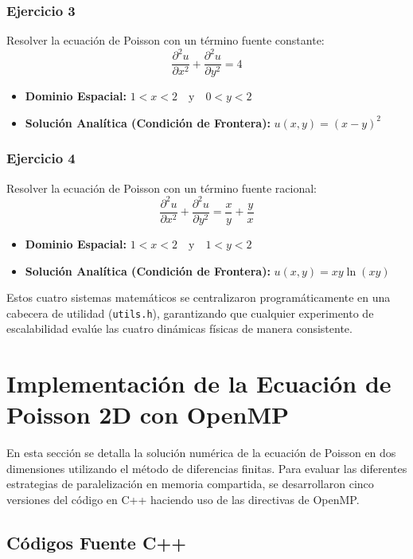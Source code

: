 \subsubsection*{Ejercicio 3}
Resolver la ecuación de Poisson con un término fuente constante:
\begin{equation}
    \frac{\partial^2 u}{\partial x^2} + \frac{\partial^2 u}{\partial y^2} = 4
\end{equation}
\begin{itemize}
    \item \textbf{Dominio Espacial:} $1 < x < 2 \quad \text{y} \quad 0 < y < 2$
    \item \textbf{Solución Analítica (Condición de Frontera):} $u(x,y) = (x-y)^2$
\end{itemize}

\subsubsection*{Ejercicio 4}
Resolver la ecuación de Poisson con un término fuente racional:
\begin{equation}
    \frac{\partial^2 u}{\partial x^2} + \frac{\partial^2 u}{\partial y^2} = \frac{x}{y} + \frac{y}{x}
\end{equation}
\begin{itemize}
    \item \textbf{Dominio Espacial:} $1 < x < 2 \quad \text{y} \quad 1 < y < 2$
    \item \textbf{Solución Analítica (Condición de Frontera):} $u(x,y) = xy \ln(xy)$
\end{itemize}

Estos cuatro sistemas matemáticos se centralizaron programáticamente en una cabecera de utilidad (\texttt{utils.h}), garantizando que cualquier experimento de escalabilidad evalúe las cuatro dinámicas físicas de manera consistente.

\section{Implementación de la Ecuación de Poisson 2D con OpenMP}

En esta sección se detalla la solución numérica de la ecuación de Poisson en dos dimensiones utilizando el método de diferencias finitas. Para evaluar las diferentes estrategias de paralelización en memoria compartida, se desarrollaron cinco versiones del código en C++ haciendo uso de las directivas de OpenMP.

\subsection{Códigos Fuente C++}


